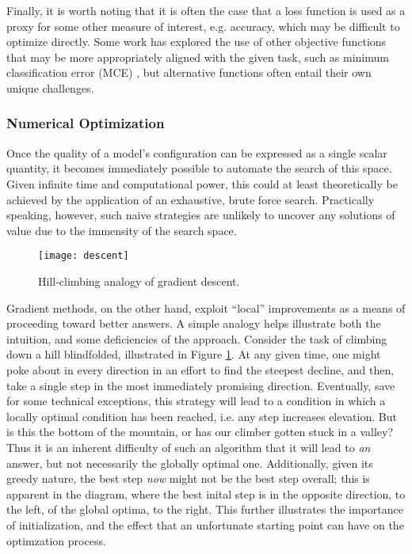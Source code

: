 Finally, it is worth noting that it is often the case that a loss function is used as a proxy for some other measure of interest, e.g. accuracy, which may be difficult to optimize directly.
Some work has explored the use of other objective functions that may be more appropriately aligned with the given task, such as minimum classification error (MCE) \cite{who?}, but alternative functions often entail their own unique challenges.


\subsubsection{Numerical Optimization}
\label{subsubsec:numopt}
Once the quality of a model's configuration can be expressed as a single scalar quantity, it becomes immediately possible to automate the search of this space.
Given infinite time and computational power, this could at least theoretically be achieved by the application of an exhaustive, brute force search.
Practically speaking, however, such naive strategies are unlikely to uncover any solutions of value due to the immensity of the search space.

\begin{figure}
\begin{centering}
\texttt{[image: descent]}
\caption{Hill-climbing analogy of gradient descent.}
\label{fig:climbing}
\end{centering}
\end{figure}

Gradient methods, on the other hand, exploit ``local'' improvements as a means of proceeding toward better answers.
A simple analogy helps illustrate both the intuition, and some deficiencies of the approach.
Consider the task of climbing down a hill blindfolded, illustrated in Figure \ref{fig:climbing}.
At any given time, one might poke about in every direction in an effort to find the steepest decline, and then, take a single step in the most immediately promising direction.
Eventually, save for some technical exceptions, this strategy will lead to a condition in which a locally optimal condition has been reached, i.e. any step increases elevation.
But is this the bottom of the mountain, or has our climber gotten stuck in a valley?
Thus it is an inherent difficulty of such an algorithm that it will lead to \emph{an} answer, but not necessarily the globally optimal one.
Additionally, given its greedy nature, the best step \emph{now} might not be the best step overall;
this is apparent in the diagram, where the best inital step is in the opposite direction, to the left, of the global optima, to the right.
This further illustrates the importance of initialization, and the effect that an unfortunate starting point can have on the optimzation process.

